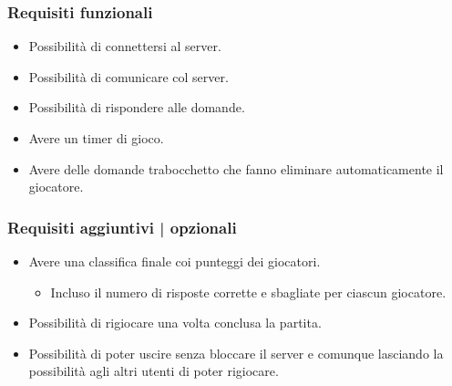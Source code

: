 \subsubsection{Requisiti funzionali}

\begin{itemize}
	\item \textsf{\normalsize Possibilità di connettersi al server.}
	\item \textsf{\normalsize Possibilità di comunicare col server.}
	\item \textsf{\normalsize Possibilità di rispondere alle domande.}
	\item \textsf{\normalsize Avere un timer di gioco.}
	\item \textsf{\normalsize Avere delle domande trabocchetto che fanno eliminare automaticamente il giocatore.}
\end{itemize}

\subsubsection{Requisiti aggiuntivi | opzionali}
\begin{itemize}
	\item \textsf{\normalsize Avere una classifica finale coi punteggi dei giocatori.}
	\begin{itemize}
		\item \textsf{\normalsize Incluso il numero di risposte corrette e sbagliate per ciascun giocatore.}
	\end{itemize}
	\item \textsf{\normalsize Possibilità di rigiocare una volta conclusa la partita.}
	\item \textsf{\normalsize Possibilità di poter uscire senza bloccare il server e comunque lasciando la possibilità agli altri utenti di poter rigiocare.}
\end{itemize}


\begin{comment} %
\subsection{Fasi di gioco}

\begin{itemize}
\item \textsf{\normalsize Gli utenti si connettono al server}
\item \textsf{\normalsize}
\item \textsf{\normalsize}
\item \textsf{\normalsize}
\end{itemize}
\end{comment}
